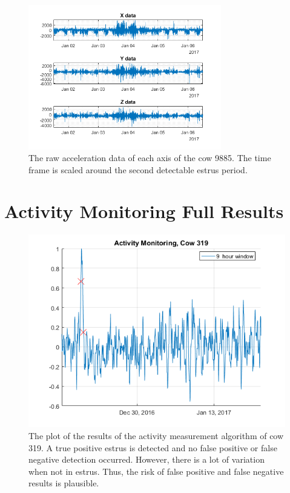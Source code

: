 \begin{figure}[h]
\centering
\includegraphics[width = 0.75\textwidth]{figures/kiimadata_9885_2.png}
\caption{The raw acceleration data of each axis of the cow 9885. The time frame is scaled around the second detectable estrus period. }
\label{kiimadata_9885_2}
\end{figure}

\clearpage
\section{Activity Monitoring Full Results}

\begin{figure}[h]
\centering
\includegraphics[width = 0.75 \textwidth]{figures/ActivityMonitoringCow319.png}
\caption{The plot of the results of the activity measurement algorithm of cow 319. A true positive estrus is detected and no false positive or false negative detection occurred. However, there is a lot of variation when not in estrus. Thus, the risk of false positive and false negative results is plausible.}
\label{ActivityMonitoringCow319}
\end{figure}

